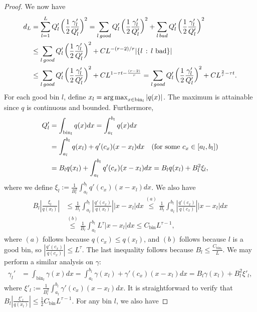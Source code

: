 \documentclass{article}
\newcommand{\bin}{\text{bin}}
\begin{document}
\begin{proof}
We now have
\begin{align*}
d_L &= \sum_{l=1}^L Q_l' \left( \frac{1}{2} \frac{\gamma_l'}{Q_l'} \right)^2 = \sum_{l \, good} Q_l' \left( \frac{1}{2} \frac{\gamma_l'}{Q_l'} \right)^2 + 
      \sum_{l \, bad} Q_l' \left( \frac{1}{2} \frac{\gamma_l'}{Q_l'} \right)^2 \\
   &\leq   \sum_{l \, good} Q_l' \left( \frac{1}{2} \frac{\gamma_l'}{Q_l'} \right)^2 + 
       C L^{-(r-2)/r} | \{ l \,:\, l \textrm{ bad} \}| \\
   &\leq  \sum_{l \, good} Q_l' \left( \frac{1}{2} \frac{\gamma_l'}{Q_l'} \right)^2 + 
          C L^{1 - \tau t - \frac{(r-2)}{r}} =  \sum_{l \, good} Q_l' \left( \frac{1}{2} \frac{\gamma_l'}{Q_l'} \right)^2 + 
        C L^{\frac{2}{r} - \tau t}. 
\end{align*}
For each good bin $l$, define $x_l = \argmax_{x \in \bin_l} | q(x) |$. The maximum is attainable since $q$ is continuous and bounded. Furthermore,
\begin{align*}
Q_l' &= \int_{\bin_l} q(x) dx = \int_{a_l}^{b_l} q(x) dx \\
 &= \int_{a_l}^{b_l} q(x_l) + q'(c_x) (x - x_l) dx \quad \trm{(for some $c_x \in [a_l, b_l]$)}\\
 &= B_l q(x_l) + \int_{a_l}^{b_l} q'(c_x)(x-x_l) dx = B_l q(x_l) + B_l^2 \xi_l,
\end{align*}
where we define $\xi_l := \frac{1}{B_l^2} \int_{a_l}^{b_l} q'(c_x) (x-x_l) dx$. We also have
\begin{align*}
B_l \left| \frac{\xi_l}{q(x_l)} \right| 
    & \leq \frac{1}{B_l} \int_{a_l}^{b_l} \left|\frac{q'(c_x)}{q(x_l)} \right| |x - x_l| dx 
   \stackrel{(a)}{\leq} \frac{1}{B_l} \int_{a_l}^{b_l} \left|\frac{q'(c_x)}{q(c_x)} \right| |x - x_l| dx \\
%
& \stackrel{(b)}{\leq} \frac{1}{B_l} \int_{a_l}^{b_l} L^{\tau} |x - x_l| dx \leq 
 C_\bin L^{\tau - 1}, 
\end{align*} 
where $(a)$ follows because $q(c_x) \leq q(x_l)$, and $(b)$ follows because $l$ is a good bin, so
$\left| \frac{q'(c_x)}{q(c_x)} \right| \leq L^\tau$. The last inequality follows because $B_l \leq \frac{C_{\bin_l}}{L}$. We may perform a similar analysis on $\gamma$:
\begin{align*}
\gamma_l' &= \int_{\bin_l} \gamma(x) dx =  \int_{a_l}^{b_l} \gamma(x_l) + \gamma'(c_x) (x - x_l) dx = B_l \gamma(x_l) + B_l^2 \xi'_l,
\end{align*}  
where $\xi'_l := \frac{1}{B_l^2} \int_{a_l}^{b_l} \gamma'(c_x)(x - x_l) dx$. It is straightforward to verify that $ B_l \left| \frac{\xi'_l}{q(x_l)}\right| \leq \frac{1}{2} C_\bin L^{\tau - 1}$. For any bin $l$, we also have

\end{proof}
\end{document}
